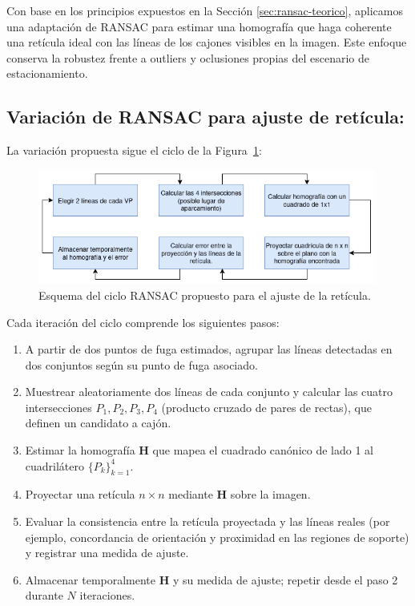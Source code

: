 
Con base en los principios expuestos en la Sección \ref{sec:ransac-teorico},
aplicamos una adaptación de RANSAC para estimar una homografía que haga coherente una retícula ideal con
las líneas de los cajones visibles en la imagen. Este enfoque conserva la robustez frente a outliers y
oclusiones propias del escenario de estacionamiento.

\subsection{Variación de RANSAC para ajuste de retícula:}

La variación propuesta sigue el ciclo de la Figura~\ref{fig:ramsac-flujo}:

\begin{figure}[!ht]
    \centering
    \includegraphics[width=0.99\textwidth]{img/3-metodo/ramsac-loop1.png}
    \caption{Esquema del ciclo RANSAC propuesto para el ajuste de la retícula.}
    \label{fig:ramsac-flujo}
\end{figure}


Cada iteración del ciclo comprende los siguientes pasos:
\begin{enumerate}
    \item A partir de dos puntos de fuga estimados, agrupar las líneas detectadas en dos conjuntos según su punto de fuga asociado.
    \item Muestrear aleatoriamente dos líneas de cada conjunto y calcular las cuatro intersecciones \(P_1, P_2, P_3, P_4\) (producto cruzado de pares de rectas), que definen un candidato a cajón.
    \item Estimar la homografía \(\mathbf{H}\) que mapea el cuadrado canónico de lado 1 al cuadrilátero \(\{P_k\}_{k=1}^4\).
    \item Proyectar una retícula \(n\times n\) mediante \(\mathbf{H}\) sobre la imagen.
    \item Evaluar la consistencia entre la retícula proyectada y las líneas reales (por ejemplo, concordancia de orientación y proximidad en las regiones de soporte) y registrar una medida de ajuste.
    \item Almacenar temporalmente \(\mathbf{H}\) y su medida de ajuste; repetir desde el paso 2 durante \(N\) iteraciones.
\end{enumerate}


